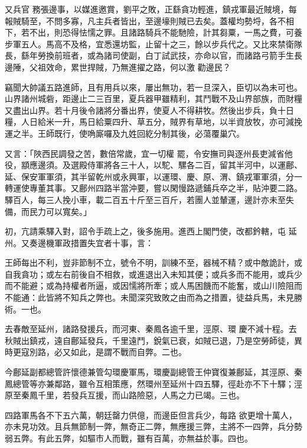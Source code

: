 \begin{pinyinscope}
 又兵官
 務張邊事，以媒進邀賞，劉平之敗，正繇貪功輕進，鎮戎軍最近賊境，每報賊騎至，不問多寡，凡主兵者皆出，至邊壕則賊已去矣。蓋權均勢埒，各不相下，若不出，則恐得怯懦之罪。且諸路騎兵不能馳險，計其芻粟，一馬之費，可養步軍五人。馬高不及格，宜悉還坊監，止留十之三，餘以步兵代之。又比來禁衛隊長，繇年勞換前班者，或為諸司使副，白丁試武技，亦命以官，而諸路弓箭手生長邊陲，父祖效命，累世捍賊，乃無進擢之路，何以激
 勸邊民？



 竊聞大帥議五路進師，且有用兵以來，屢出無功，若一旦深入，臣切以為未可也。山界諸州城砦，距邊止二三百里，夏兵器甲雖精利，其鬥戰不及山界部族，而財糧又盡出山界。若十月後令諸將分番出界，使夏人不得耕牧。然後出步兵，負十日糧，人日給米一升，馬日給粟四升、草五分，賊界有草地，以半資放牧，亦可減挽運之半。王師既行，使唃廝囉及九姓回紇分制其後，必蕩覆巢穴。



 又言：「陜西民調發之苦，數倍常歲，宜一切權
 罷，令安撫司與逐州長吏減省他役，顓應邊須。及選殿侍軍將各三十人，以駝、騾各二百，留其半河中，以運鄜、延、保安軍軍須，其半留乾州或永興軍，以運環、慶、原、渭、鎮戎軍軍須，分一轉運使專董其事。又鄜州四路半當沖要，嘗以閑慢路遞鋪兵卒之半，貼沖要二路。驛百人，每三人挽小車，載二百五十斤至三百斤，若團人並輦運，邊計亦未至失備，而民力可以寬矣。」



 初，亢請乘驛入對，詔令手疏上之，後多施用。進西上閣門使，改都鈐轄，屯
 延州。又奏邊機軍政措置失宜者十事，言：



 王師每出不利，豈非節制不立，號令不明，訓練不至，器械不精？或中敵詭計，或自我貪功；或左右前後自不相救，或進退出入未知其便；或兵多而不能用，或兵少而不能避；或為持權者所逼，或因懦將所牽；或人馬困饑而不能奮，或山川險阻而不能通：此皆將不知兵之弊也。未聞深究致敗之由而為之措置，徒益兵馬，未見勝術。一也。



 去春敵至延州，諸路發援兵，而河東、秦鳳各逾千里，涇原、環
 慶不減十程。去秋賊出鎮戎，遠自鄜延發兵，千里遠鬥，銳氣已衰，如賊已退，乃是空勞師徒，異時更寇別路，必又如此，是謂不戰而自弊。二也。



 今鄜延副都總管許懷德兼管勾環慶軍馬，環慶副總管王仲寶復兼鄜延，其涇原、秦鳳總管等亦兼鄰路，雖令互相策應，然環州至延州十四五驛，徑赴亦不下十驛；涇原至秦鳳千里，若發兵互援，而山路險惡，人馬之力已竭。三也。



 四路軍馬各不下五六萬，朝廷罄力供億，而邊臣但言兵少，每路
 欲更增十萬人，亦未見功效。且兵無節制一弊，無奇正二弊，無應援三弊，主將不一四弊，兵分勢弱五弊。有此五弊，如驅市人而戰，雖有百萬，亦無益於事。四也。




\end{pinyinscope}
